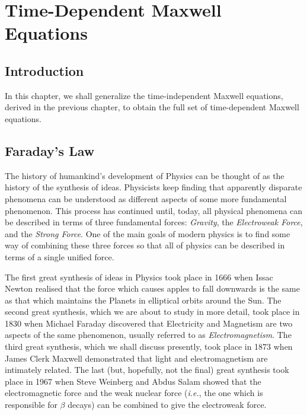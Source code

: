 \chapter{Time-Dependent Maxwell Equations}\label{maxwell2}
\section{Introduction}
In this chapter, we shall generalize the time-independent Maxwell equations,
derived in the previous chapter,
to obtain the full set of time-dependent Maxwell equations.
\section{Faraday's Law}
The history of humankind's development of Physics
can be thought of as the history of the synthesis of ideas. Physicists keep finding that
apparently disparate phenomena can be understood as different aspects of some
more fundamental phenomenon. This process has continued until, today, all physical
phenomena can be described in terms of three fundamental forces: {\em Gravity}, the
{\em Electroweak Force}, and the {\em Strong Force}. One of the main goals of modern physics
is to find some way of combining these three forces so that all
of physics can be described in  terms of a single unified force.

The first great synthesis of ideas in Physics took place in 1666 when Issac Newton
realised that the force which causes apples to fall downwards is the same as that which maintains the Planets in elliptical orbits around the Sun. The second
great synthesis, which we are about to study in more detail, took place in
1830 when Michael Faraday discovered that Electricity and Magnetism are two
aspects of the same phenomenon, usually referred to as
{\em Electromagnetism}. The third great synthesis, which we shall discuss
presently, took place in 1873 when James Clerk Maxwell demonstrated that light
and electromagnetism are intimately related.  The last (but, hopefully,
not the final) great synthesis took place in 1967 when Steve Weinberg and
Abdus Salam showed that the electromagnetic force
and the weak nuclear force ({\em i.e.}, the one which is responsible for $\beta$ decays)
can be combined to give the electroweak force.

